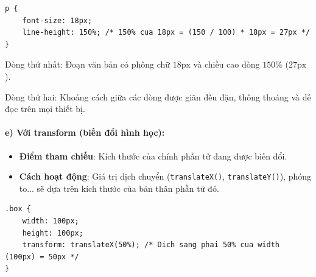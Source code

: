 \documentclass[11pt,oneside]{book}
\newcommand{\codeinline}[1]{\textcolor{accentOrange}{\texttt{#1}}}
\begin{document}
\begin{codeWindow}
\begin{lstlisting}[language=CSS3]
p {
    font-size: 18px;
    line-height: 150%; /* 150% cua 18px = (150 / 100) * 18px = 27px */
}
\end{lstlisting}
\end{codeWindow}

\begin{browserWindow}
\sffamily\small
\begin{tcolorbox}[enhanced, colback=codeBg, colframe=primaryBlue!30, arc=6pt, boxrule=0.8pt, top=8pt, bottom=8pt, left=12pt, right=12pt]
  {\fontsize{13pt}{19.5pt}\selectfont \color{darkText}
  Dòng thứ nhất: Đoạn văn bản có phông chữ $18\text{px}$ và chiều cao dòng $150\%$ ($27\text{px}$).\par
  Dòng thứ hai: Khoảng cách giữa các dòng được giãn đều đặn, thông thoáng và dễ đọc trên mọi thiết bị.
  }
\end{tcolorbox}
\end{browserWindow}

\paragraph{e) Với transform (biến đổi hình học):}
\begin{itemize}[leftmargin=1.5em, itemsep=2pt, parsep=0pt]
    \item \textbf{Điểm tham chiếu}: Kích thước của chính phần tử đang được biến đổi.
    \item \textbf{Cách hoạt động}: Giá trị dịch chuyển (\codeinline{translateX()}, \codeinline{translateY()}), phóng to... sẽ dựa trên kích thước của bản thân phần tử đó.
\end{itemize}

\begin{codeWindow}
\begin{lstlisting}[language=CSS3]
.box {
    width: 100px;
    height: 100px;
    transform: translateX(50%); /* Dich sang phai 50% cua width (100px) = 50px */
}
\end{lstlisting}
\end{codeWindow}
\end{document}
